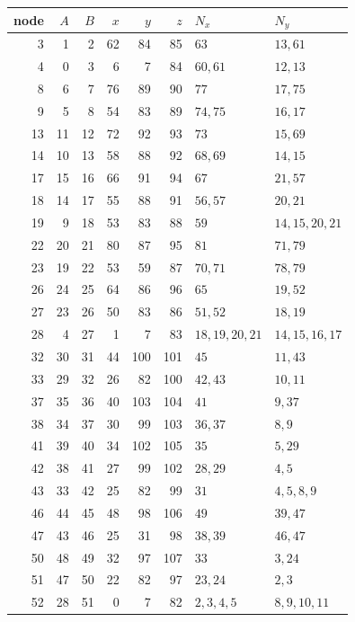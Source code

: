 \begin{center}\scriptsize
\begin{tabular}{r|rr|rr|r|l|l}
node & $A$ & $B$ & $x$ & $y$ & $z$ & $N_x$ & $N_y$\\\hline
3 & 1 & 2 & 62 & 84 & 85 & $63$ & $13,61$\\
4 & 0 & 3 & 6 & 7 & 84 & $60,61$ & $12,13$\\
8 & 6 & 7 & 76 & 89 & 90 & $77$ & $17,75$\\
9 & 5 & 8 & 54 & 83 & 89 & $74,75$ & $16,17$\\
13 & 11 & 12 & 72 & 92 & 93 & $73$ & $15,69$\\
14 & 10 & 13 & 58 & 88 & 92 & $68,69$ & $14,15$\\
17 & 15 & 16 & 66 & 91 & 94 & $67$ & $21,57$\\
18 & 14 & 17 & 55 & 88 & 91 & $56,57$ & $20,21$\\
19 & 9 & 18 & 53 & 83 & 88 & $59$ & $14,15,20,21$\\
22 & 20 & 21 & 80 & 87 & 95 & $81$ & $71,79$\\
23 & 19 & 22 & 53 & 59 & 87 & $70,71$ & $78,79$\\
26 & 24 & 25 & 64 & 86 & 96 & $65$ & $19,52$\\
27 & 23 & 26 & 50 & 83 & 86 & $51,52$ & $18,19$\\
28 & 4 & 27 & 1 & 7 & 83 & $18,19,20,21$ & $14,15,16,17$\\
32 & 30 & 31 & 44 & 100 & 101 & $45$ & $11,43$\\
33 & 29 & 32 & 26 & 82 & 100 & $42,43$ & $10,11$\\
37 & 35 & 36 & 40 & 103 & 104 & $41$ & $9,37$\\
38 & 34 & 37 & 30 & 99 & 103 & $36,37$ & $8,9$\\
41 & 39 & 40 & 34 & 102 & 105 & $35$ & $5,29$\\
42 & 38 & 41 & 27 & 99 & 102 & $28,29$ & $4,5$\\
43 & 33 & 42 & 25 & 82 & 99 & $31$ & $4,5,8,9$\\
46 & 44 & 45 & 48 & 98 & 106 & $49$ & $39,47$\\
47 & 43 & 46 & 25 & 31 & 98 & $38,39$ & $46,47$\\
50 & 48 & 49 & 32 & 97 & 107 & $33$ & $3,24$\\
51 & 47 & 50 & 22 & 82 & 97 & $23,24$ & $2,3$\\
52 & 28 & 51 & 0 & 7 & 82 & $2,3,4,5$ & $8,9,10,11$\\
\end{tabular}
\end{center}
